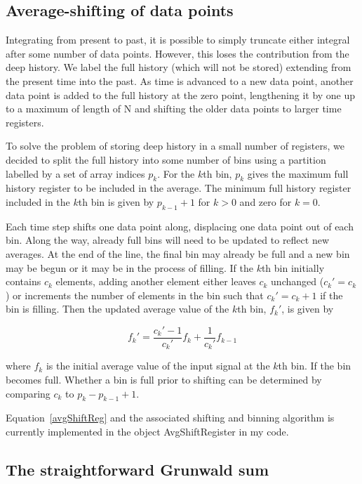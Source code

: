 \documentclass[12]{article}
\begin{document}
\subsection{Average-shifting of data points}

Integrating from present to past, it is possible to simply truncate
either integral after some number of data points. However, this loses
the contribution from the deep history. We label the full history
(which will not be stored) extending from the present time into the
past. As time is advanced to a new data point, another data point is
added to the full history at the zero point, lengthening it by one up
to a maximum of length of N and shifting the older data points to
larger time registers.

To solve the problem of storing deep history in a small number of
registers, we decided to split the full history into some number of
bins using a partition labelled by a set of array indices $p_k$. For
the $k$th bin, $p_k$ gives the maximum full history register to be
included in the average. The minimum full history register included in
the $k$th bin is given by $p_{k-1}+1$ for $k>0$ and zero for $k=0$.

Each time step shifts one data point along, displacing one data point
out of each bin. Along the way, already full bins will need to be
updated to reflect new averages. At the end of the line, the final bin
may already be full and a new bin may be begun or it may be in the
process of filling. If the $k$th bin initially contains $c_k$
elements, adding another element either leaves $c_k$ unchanged
($c_k\prime=c_k$) or increments the number of elements in the bin such
that $c_k\prime = c_k + 1$ if the bin is filling. Then the updated average
value of the $k$th bin, $f_k\prime$, is given by

\begin{equation}
f_k\prime = \frac{c_k\prime-1}{c_k\prime}f_k + \frac{1}{c_k\prime}f_{k-1}
\label{avgShiftReg}
\end{equation}

\noindent where $f_k$ is the initial average value of the input signal
at the $k$th bin. If the bin becomes full. Whether a bin is full prior
to shifting can be determined by comparing $c_k$ to $p_k-p_{k-1}+1$.

Equation~\ref{avgShiftReg} and the associated shifting and binning
algorithm is currently implemented in the object AvgShiftRegister in
my code.

\subsection{The straightforward Grunwald sum}
\end{document}
